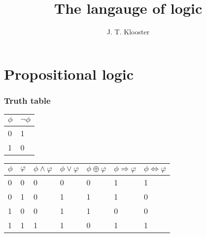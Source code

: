 \documentclass{report}
\begin{document}
\author{J. T. Klooster}
\title{The langauge of logic}
\maketitle
\tableofcontents
\chapter{Propositional logic}

\subsection{Truth table}

\noindent
\begin{tabular}{@{}l|l@{}}\toprule
$\phi$ 	& $\neg \phi$ 	\\ \midrule
0 		& 1	 			\\ \midrule
1		& 0				\\ \bottomrule
\end{tabular}

\noindent
\begin{tabular}{@{}l|l|l|l|l|l|l@{}}\toprule
$\phi$&$\varphi$&$\phi\wedge\varphi$&$\phi\vee\varphi$&$\phi\oplus\varphi$&
$\phi\Rightarrow\varphi$&$\phi\iff\varphi$\\ \midrule
0&0&0&0&0&1&1\\ \midrule
0&1&0&1&1&1&0\\ \midrule
1&0&0&1&1&0&0\\ \midrule
1&1&1&1&0&1&1\\ \midrule
\end{tabular}
\end{document}

